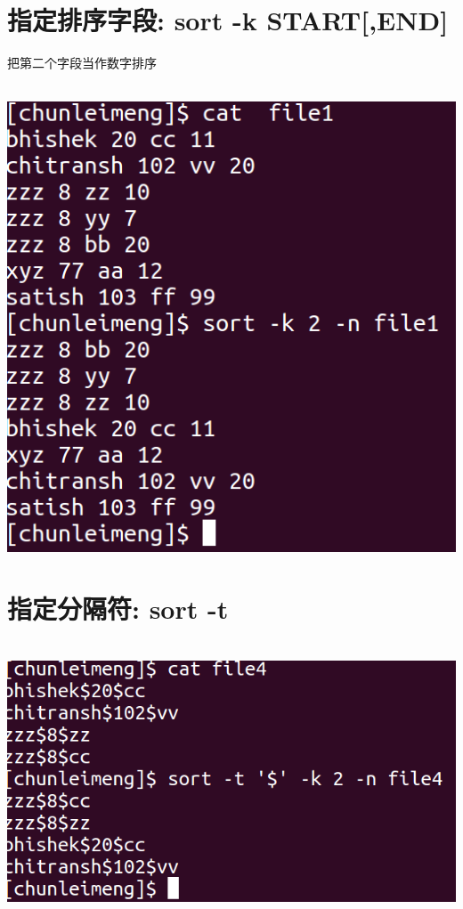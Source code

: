 \documentclass{article}
\begin{document}
\section{指定排序字段: sort -k START[,END]}
把第二个字段当作数字排序\par
~\\
\includegraphics[scale=0.4]{pic7.png} \par
\section{指定分隔符: sort -t}
~\\
\includegraphics[scale=0.5]{pic8.png} \par
\end{document}
